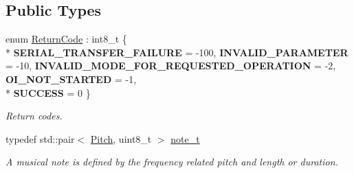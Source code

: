 \subsection*{Public Types}
\begin{DoxyCompactItemize}
\item 
\hypertarget{classroomba_1_1series500_1_1oi_1_1_o_i_command_ab408b9562318caf292794d8ba335d5ed}{enum \hyperlink{classroomba_1_1series500_1_1oi_1_1_o_i_command_ab408b9562318caf292794d8ba335d5ed}{Return\+Code} \+: int8\+\_\+t \{ \\*
{\bfseries S\+E\+R\+I\+A\+L\+\_\+\+T\+R\+A\+N\+S\+F\+E\+R\+\_\+\+F\+A\+I\+L\+U\+R\+E} = -\/100, 
{\bfseries I\+N\+V\+A\+L\+I\+D\+\_\+\+P\+A\+R\+A\+M\+E\+T\+E\+R} = -\/10, 
{\bfseries I\+N\+V\+A\+L\+I\+D\+\_\+\+M\+O\+D\+E\+\_\+\+F\+O\+R\+\_\+\+R\+E\+Q\+U\+E\+S\+T\+E\+D\+\_\+\+O\+P\+E\+R\+A\+T\+I\+O\+N} = -\/2, 
{\bfseries O\+I\+\_\+\+N\+O\+T\+\_\+\+S\+T\+A\+R\+T\+E\+D} = -\/1, 
\\*
{\bfseries S\+U\+C\+C\+E\+S\+S} = 0
 \}}\label{classroomba_1_1series500_1_1oi_1_1_o_i_command_ab408b9562318caf292794d8ba335d5ed}

\begin{DoxyCompactList}\small\item\em Return codes. \end{DoxyCompactList}\item 
typedef std\+::pair$<$ \hyperlink{namespaceroomba_1_1series500_1_1oi_a1a8bf7d79627d7b145a833e43b8cd214}{Pitch}, uint8\+\_\+t $>$ \hyperlink{classroomba_1_1series500_1_1oi_1_1_o_i_command_a43c80e2975163914fa178978b4646b92}{note\+\_\+t}
\begin{DoxyCompactList}\small\item\em A musical note is defined by the frequency related pitch and length or duration. \end{DoxyCompactList}\end{DoxyCompactItemize}
